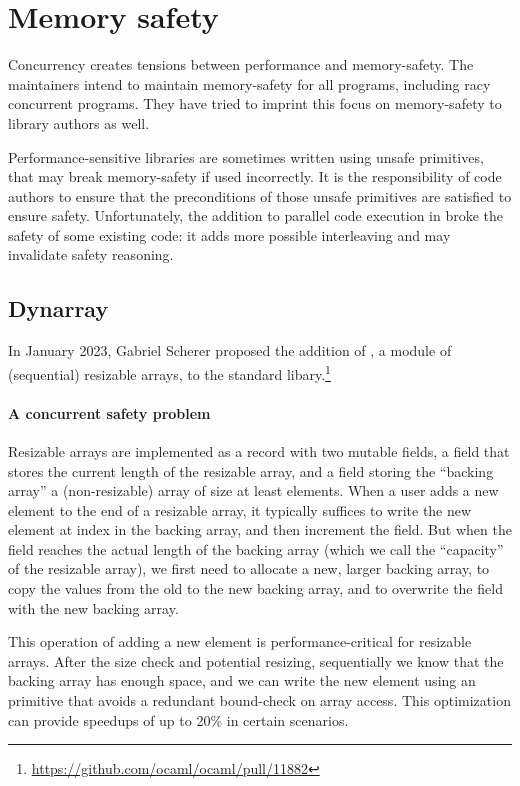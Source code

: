 \section{Memory safety}

Concurrency creates tensions between performance and memory-safety. The \OCaml maintainers intend to maintain memory-safety for all \OCaml programs, including racy concurrent programs. They have tried to imprint this focus on memory-safety to library authors as well.

Performance-sensitive \OCaml libraries are sometimes written using unsafe primitives, that may break memory-safety if used incorrectly. It is the responsibility of code authors to ensure that the preconditions of those unsafe primitives are satisfied to ensure safety. Unfortunately, the addition to parallel code execution in \OCamlFive broke the safety of some existing code: it adds more possible interleaving and may invalidate safety reasoning.

\subsection{Dynarray} In January 2023, Gabriel Scherer proposed the addition of , a module of (sequential) resizable arrays, to the \OCaml standard libary.\footnote{\url{https://github.com/ocaml/ocaml/pull/11882}} 

\paragraph{A concurrent safety problem}

Resizable arrays are implemented as a record with two mutable fields, a  field that stores the current length of the resizable array, and a  field storing the ``backing array'' a (non-resizable) array of size at least  elements. When a user adds a new element to the end of a resizable array, it typically suffices to write the new element at index  in the backing array, and then increment the  field. But when the  field reaches the actual length of the backing array (which we call the ``capacity'' of the resizable array), we first need to allocate a new, larger backing array, to copy the values from the old to the new backing array, and to overwrite the  field with the new backing array.

This operation of adding a new element is performance-critical for resizable arrays. After the size check and potential resizing, sequentially we know that the backing array has enough space, and we can write the new element using an  primitive that avoids a redundant bound-check on array access. This optimization can provide speedups of up to 20\% in certain scenarios.

